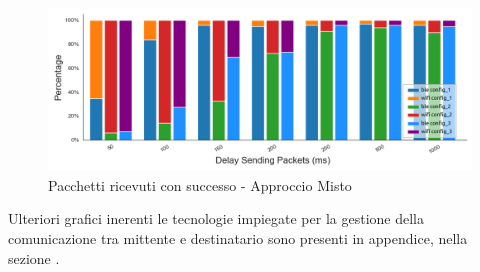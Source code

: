 \begin{figure}[hbt!]
    \centering
    \includegraphics[width = 1\textwidth]{images/graphs/myplot_packets.png}
    \caption{Pacchetti ricevuti con successo - Approccio Misto}
    \label{graph:mix_packets_percentuage}
\end{figure}

\noindent Ulteriori grafici inerenti le tecnologie impiegate per la gestione della comunicazione tra mittente e destinatario sono presenti in appendice, nella sezione \textit{}.


